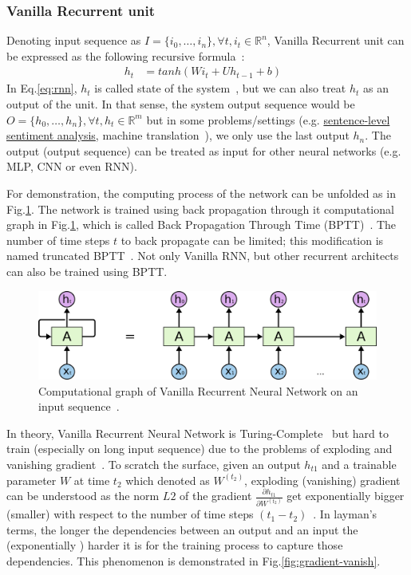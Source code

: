 \subsubsection{Vanilla Recurrent unit}\label{sec:vanilla-rnn}
Denoting input sequence as \(I = \{i_0,\ldots,i_n\}, \forall t, i_t \in \mathbb{R}^n\), Vanilla Recurrent unit can be expressed as the following recursive formula~\cite{treeLSTM}:
\begin{align}
      h_t &= tanh(Wi_t + Uh_{t-1} + b)&\label{eq:rnn}
\end{align}
In Eq.\ref{eq:rnn}, \(h_t\) is called state of the system~\cite{deeplearning-book}, but we can also treat \(h_t\) as an output of the unit.
In that sense, the system output sequence would be \(O = \{h_0,\ldots,h_n\}, \forall t, h_t \in \mathbb{R}^m\) but in some problems/settings (e.g. \hyperref[sec:sent-level]{sentence-level sentiment analysis}, machine translation~\cite{SutskeverVL14}), we only use the last output \(h_n\).
The output (output sequence) can be treated as input for other neural networks (e.g. MLP, CNN or even RNN).

For demonstration, the computing process of the network can be unfolded as in Fig.\ref{fig:rnn-unfold}.
The network is trained using back propagation through it computational graph in Fig.\ref{fig:rnn-unfold}, which is called Back Propagation Through Time (BPTT)~\cite{BPTT}.
The number of time steps \(t\) to back propagate can be limited; this modification is named truncated BPTT~\cite{truncatedBPTT}.
Not only Vanilla RNN, but other recurrent architects can also be trained using BPTT.

\begin{figure}[H]
    \centering
    \includegraphics[scale=0.4]{figure/rnn-unroll}
    \caption[Vanilla Recurrent Neural Network]{Computational graph of Vanilla Recurrent Neural Network on an input sequence~\cite{colah-lsmt}.}
    \label{fig:rnn-unfold}
\end{figure}
\label{sec:gradient-vanish}
In theory, Vanilla Recurrent Neural Network is Turing-Complete~\cite{rnn-turing-complete} but  hard to train (especially on long input sequence) due to the problems of exploding and vanishing gradient~\cite{Bengio1994}.
To scratch the surface, given an output \(h_{t1}\) and a trainable parameter \(W\) at time \(t_2\) which denoted as \(W^{(t_2)}\),  exploding (vanishing) gradient can be understood as the norm \(L2\) of the gradient \(\frac{\partial h_{t1}}{\partial W^{(t_2)}}\) get exponentially bigger (smaller) with respect to the number of time steps \((t_1-t_2)\)~\cite{Bengio1994}.
In layman's terms, the longer the dependencies between an output and an input the (exponentially ) harder it is for the training process to capture those dependencies.
This phenomenon is demonstrated in Fig.\ref{fig:gradient-vanish}.

